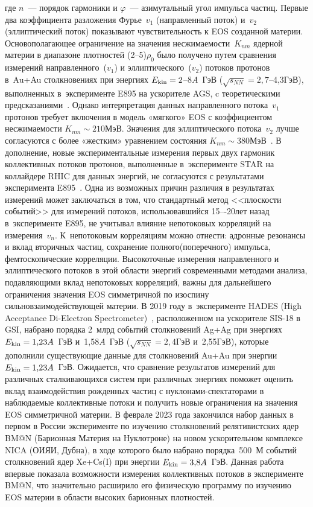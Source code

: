 %
где $n$~--- порядок гармоники и  $\varphi$~--- азимутальный угол импульса частиц.
Первые два коэффициента разложения Фурье~$v_1$ (направленный поток) и~$v_2$ (эллиптический поток) показывают чувствительность к EOS созданной материи.
Основополагающее ограничение на значения несжимаемости~$K_{nm}$ ядерной материи  в диапазоне плотностей (2--5)$\rho_{0}$ было получено путем сравнения измерений направленного~($v_1$) и эллиптического~($v_2$)  потоков  протонов в~Au+Au столкновениях при энергиях  $E_{\rm kin} = 2$--8$A$~ГэВ ($\sqrt{s_{NN}} = 2{,}7$--4,3\;ГэВ), выполненных в~эксперименте E895 на ускорителе AGS, c теоретическими предсказаниями~\cite{E895:1999ldn,E895:2000maf,E895:2001axb}. 
Однако интерпретация данных направленного потока~$v_1$ протонов требует включения в модель «мягкого» EOS с коэффициентом несжимаемости $K_{nm} \sim 210$\;МэВ. 
Значения  для эллиптического потока~$v_2$ лучше согласуются с более «жестким» уравнением состояния $K_{nm} \sim 380$\;МэВ~\cite{Danielewicz:2002pu}. 
В дополнение, новые экспериментальные измерения первых двух гармоник коллективных потоков протонов, выполненные в~эксперименте  STAR \cite{STAR:2020dav,star3gev} на коллайдере RHIC для данных энергий, не согласуются с результатами эксперимента E895~\cite{E895:1999ldn}. 
Одна из возможных причин различия в результатах измерений может заключаться в том, что стандартный метод <<плоскости событий>> для измерений потоков, использовавшийся 15–-20\;лет назад в~эксперименте E895, не учитывал влияние непотоковых корреляций  на измерения~$v_n$. 
К~непотоковым корреляциям можно отнести: адронные резонансы и вклад вторичных частиц, сохранение полного(поперечного) импульса, фемтоскопические корреляции. 
Высокоточные измерения направленного и эллиптического потоков в этой области энергий современными методами анализа, подавляющими вклад непотоковых корреляций, важны для дальнейшего ограничения значения EOS симметричной по изоспину сильновзаимодействующей материи.
В 2019 году в~эксперименте HADES (High Acceptance Di-Electron Spectrometer)~\cite{HADES:2009aat}, расположенном на ускорителе SIS-18 в GSI, набрано порядка 2~млрд событий столкновений Ag+Ag при энергиях $E_{\rm kin} = 1{,}23A$~ГэВ и~1,58$A$~ГэВ ($\sqrt{s_{NN}} = 2{,}4$\;ГэВ и~2,55\;ГэВ), которые дополнили существующие данные для столкновений Au+Au при энергии  $E_{\rm kin} = 1{,}23A$~ГэВ. 
Ожидается, что сравнение результатов измерений для различных сталкивающихся систем при различных энергиях поможет  оценить вклад взаимодействия рожденных частиц с нуклонами-спектаторами в наблюдаемые коллективные  потоки и получить новые ограничения на значения EOS симметричной материи.
В феврале 2023 года закончился набор данных в первом в России эксперименте по изучению столкновений релятивистских ядер BM@N (Барионная Материя на Нуклотроне)\cite{bmn} на новом ускорительном комплексе NICA (ОИЯИ, Дубна), в ходе которого было набрано порядка~500~М событий столкновений ядер Xe+Cs(I) при энергии  $E_{\rm kin} = 3{,}8A$~ГэВ. Данная работа впервые показала возможности измерения коллективных потоков
в эксперименте BM@N,  что значительно расширило его физическую программу по изучению EOS материи  в области высоких барионных плотностей.

